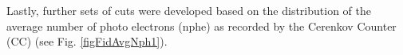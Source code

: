 %

Lastly, further sets of cuts were developed based on the distribution of the average number of photo electrons (nphe) as recorded by the Cerenkov Counter (CC) (see Fig. \ref{figFidAvgNph1}).

